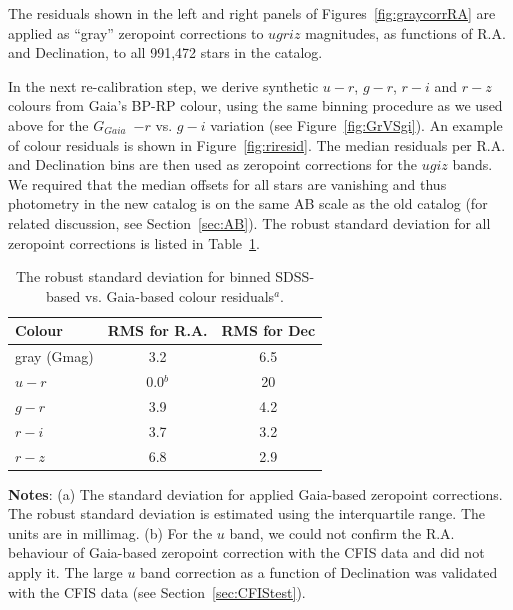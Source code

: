 \documentclass[fleqn,usenatbib]{mnras}
\newcommand{\GG}{\hbox{$G_{Gaia}$}}
\begin{document}
The residuals shown in the left and right panels of Figures~\ref{fig:graycorrRA} are
applied as ``gray'' zeropoint corrections to $ugriz$ magnitudes, as functions of 
R.A. and Declination, to all 991,472 stars in the catalog. 

In the next re-calibration step, we derive synthetic $u-r$, $g-r$, $r-i$ and $r-z$ colours
from Gaia's BP-RP colour, using the same binning procedure as we used above for 
the \GG~$-r$ vs. $g-i$ variation (see Figure~\ref{fig:GrVSgi}). An example of colour residuals 
is shown in Figure~\ref{fig:riresid}.  The median residuals per R.A. and Declination bins 
are then used as zeropoint corrections for the $ugiz$ bands. We required that the median
offsets for all stars are vanishing and thus photometry in the new catalog is on the 
same AB scale as the old catalog (for related discussion, see Section~\ref{sec:AB}). 
The robust standard deviation for all zeropoint corrections is listed in Table~\ref{tab:GaiaRMS}. 

\begin{table}
	\centering
	\caption{The robust standard deviation for binned SDSS-based vs. Gaia-based colour residuals$^a$. }
	\label{tab:GaiaRMS}

	\begin{tabular}{l|c|c} %
		\hline
		Colour & RMS for R.A. & RMS for Dec \\
		\hline
 
 gray (Gmag) &    3.2         &    6.5   \\
    $u-r$        &   0.0$^b$  &   20    \\     
    $g-r$        &   3.9         &    4.2    \\
    $r-i$         &   3.7         &    3.2    \\ 
    $r-z$        &   6.8         &    2.9    \\ 
		\hline
	\end{tabular}
     \vspace{1ex}

     {\raggedright {\bf Notes}: (a) The standard deviation for applied Gaia-based zeropoint corrections. The robust standard deviation is estimated using the interquartile range. The units are in millimag. \newline (b) For the $u$ band, we could not confirm the R.A. behaviour of Gaia-based zeropoint correction with the CFIS data and did not apply it. The large $u$ band correction as a function of Declination was validated with the CFIS data (see Section~\ref{sec:CFIStest}). \par}
\end{table}
\end{document}
